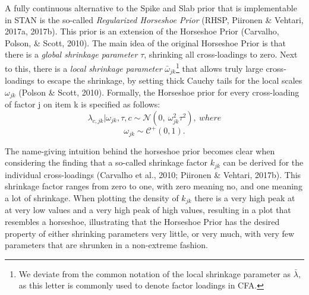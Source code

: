 \documentclass[
  english,
  man, donotrepeattitle,floatsintext]{apa6}
\begin{document}
A fully continuous alternative to the Spike and Slab prior that is implementable in STAN is the so-called \emph{Regularized Horseshoe Prior} (RHSP, Piironen \& Vehtari, 2017a, 2017b). This prior is an extension of the Horseshoe Prior (Carvalho, Polson, \& Scott, 2010). The main idea of the original Horseshoe Prior is that there is a \emph{global shrinkage parameter} \(\tau\), shrinking all cross-loadings to zero. Next to this, there is a \emph{local shrinkage parameter} \(\bar{\omega}_{jk}\)\footnote{We deviate from the common notation of the local shrinkage parameter as \(\bar{\lambda}\), as this letter is commonly used to denote factor loadings in CFA.} that allows truly large cross-loadings to escape the shrinkage, by setting thick Cauchy tails for the local scales \(\omega_{jk}\) (Polson \& Scott, 2010). Formally, the Horseshoe prior for every cross-loading of factor j on item k is specified as follows:
\[\lambda_{c,jk} | \omega_{jk}, \tau, c\sim \mathcal{N}(0, \ \omega^2_{jk} \tau^2), \ where\]
\[\omega_{jk} \sim \mathcal{C^+}(0, 1).\]

The name-giving intuition behind the horseshoe prior becomes clear when considering the finding that a so-called shrinkage factor \(k_{jk}\) can be derived for the individual cross-loadings (Carvalho et al., 2010; Piironen \& Vehtari, 2017b). This shrinkage factor ranges from zero to one, with zero meaning no, and one meaning a lot of shrinkage. When plotting the density of \(k_{jk}\) there is a very high peak at at very low values and a very high peak of high values, resulting in a plot that resembles a horseshoe, illustrating that the Horseshoe Prior has the desired property of either shrinking parameters very little, or very much, with very few parameters that are shrunken in a non-extreme fashion.
\end{document}
